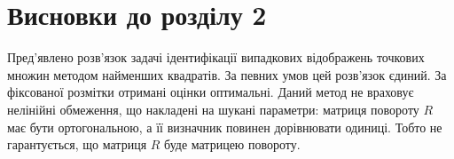 \section*{Висновки до розділу 2}

Пред'явлено розв'язок задачі ідентифікації випадкових відображень точкових
множин методом найменших квадратів.
За певних умов цей розв'язок єдиний.
За фіксованої розмітки отримані оцінки оптимальні.
Даний метод не враховує нелінійні обмеження, що накладені на шукані параметри:
матриця повороту $R$ має бути ортогональною,
а її визначник повинен дорівнювати одиниці.
Тобто не гарантується, що матриця $R$ буде матрицею повороту.
